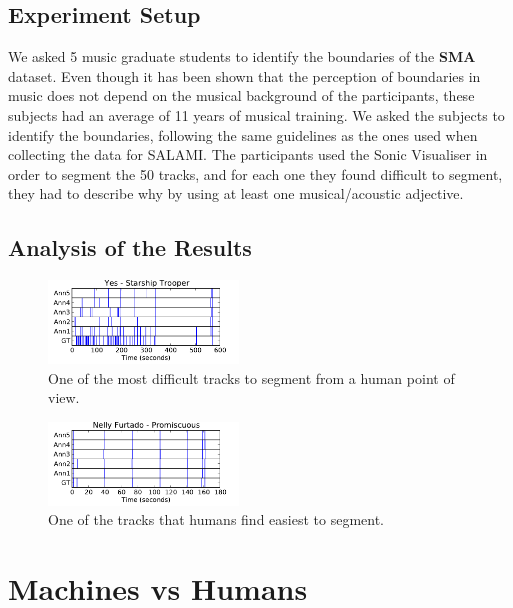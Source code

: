 \documentclass{article}
\begin{document}
\subsection{Experiment Setup}

We asked 5 music graduate students to identify the boundaries of the \textbf{SMA} dataset.
Even though it has been shown that the perception of boundaries in music does not depend on the musical background of the participants\cite{Bruderer2009}, these subjects had an average of 11 years of musical training.
We asked the subjects to identify the boundaries, following the same guidelines as the ones used when collecting the data for SALAMI\cite{Smith2011}.
The participants used the Sonic Visualiser\cite{Cannam2006} in order to segment the 50 tracks, and for each one they found difficult to segment, they had to describe why by using at least one musical/acoustic adjective.

\subsection{Analysis of the Results}


\begin{figure}
  \centering
  \includegraphics[width=0.45\textwidth, height=0.13\textheight]{plots/StarshipTrooper-human.pdf}
  \caption{One of the most difficult tracks to segment from a human point of view.}
  \label{fig:quartetto-human}
\end{figure}%

\begin{figure}
  \centering
  \includegraphics[width=0.45\textwidth, height=0.13\textheight]{plots/Promiscuous-human.pdf}
  \caption{One of the tracks that humans find easiest to segment.}
  \label{fig:promiscuous-human}
\end{figure}%

\section{Machines vs Humans}\label{section:m-vs-h}
\end{document}
